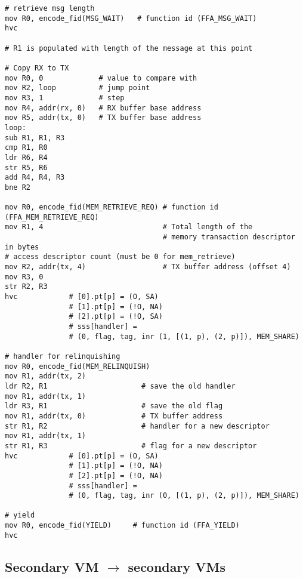 \documentclass{article}
\begin{document}
\begin{lstlisting}[caption={VM 2}]
# retrieve msg length
mov R0, encode_fid(MSG_WAIT)   # function id (FFA_MSG_WAIT)
hvc

# R1 is populated with length of the message at this point

# Copy RX to TX
mov R0, 0             # value to compare with
mov R2, loop          # jump point
mov R3, 1             # step
mov R4, addr(rx, 0)   # RX buffer base address
mov R5, addr(tx, 0)   # TX buffer base address
loop:
sub R1, R1, R3
cmp R1, R0
ldr R6, R4
str R5, R6
add R4, R4, R3
bne R2

mov R0, encode_fid(MEM_RETRIEVE_REQ) # function id (FFA_MEM_RETRIEVE_REQ)
mov R1, 4                            # Total length of the  
                                     # memory transaction descriptor in bytes
# access descriptor count (must be 0 for mem_retrieve)
mov R2, addr(tx, 4)                  # TX buffer address (offset 4)
mov R3, 0
str R2, R3                                    
hvc            # [0].pt[p] = (O, SA)
               # [1].pt[p] = (!O, NA)
               # [2].pt[p] = (!O, SA)
               # sss[handler] = 
               # (0, flag, tag, inr (1, [(1, p), (2, p)]), MEM_SHARE)

# handler for relinquishing
mov R0, encode_fid(MEM_RELINQUISH)
mov R1, addr(tx, 2)
ldr R2, R1                      # save the old handler
mov R1, addr(tx, 1)
ldr R3, R1                      # save the old flag
mov R1, addr(tx, 0)             # TX buffer address
str R1, R2                      # handler for a new descriptor
mov R1, addr(tx, 1)
str R1, R3                      # flag for a new descriptor
hvc            # [0].pt[p] = (O, SA)
               # [1].pt[p] = (!O, NA)
               # [2].pt[p] = (!O, NA)
               # sss[handler] = 
               # (0, flag, tag, inr (0, [(1, p), (2, p)]), MEM_SHARE)

# yield
mov R0, encode_fid(YIELD)     # function id (FFA_YIELD)
hvc
\end{lstlisting}

\subsection{Secondary VM $\rightarrow$ secondary VMs}
\end{document}
